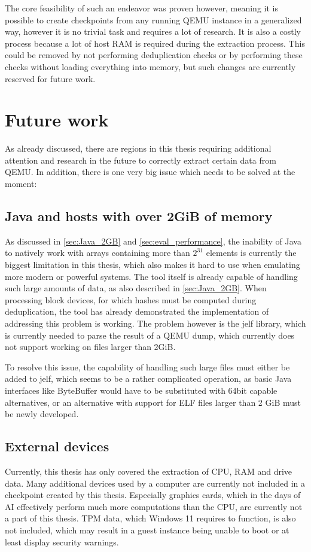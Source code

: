 The core feasibility of such an endeavor was proven however,
meaning it is possible to create checkpoints from any running QEMU instance in a generalized way,
however it is no trivial task and requires a lot of research.
It is also a costly process because a lot of host RAM is required during the extraction process.
This could be removed by not performing deduplication checks
or by performing these checks without loading everything into memory,
but such changes are currently reserved for future work.

\section{Future work}
As already discussed, there are regions in this thesis requiring additional attention and research in the future to correctly extract certain data from QEMU.
In addition, there is one very big issue which needs to be solved at the moment:

\subsection{Java and hosts with over 2GiB of memory}
As discussed in \autoref{sec:Java_2GB} and \autoref{sec:eval_performance},
the inability of Java to natively work with arrays containing more than $2^{31}$ elements
is currently the biggest limitation in this thesis,
which also makes it hard to use when emulating more modern or powerful systems.
The tool itself is already capable of handling such large amounts of data, as also described in \autoref{sec:Java_2GB}.
When processing block devices, for which hashes must be computed during deduplication,
the tool has already demonstrated the implementation of addressing this problem is working.
The problem however is the jelf library, which is currently needed to parse the result of a QEMU dump,
which currently does not support working on files larger than 2GiB.

To resolve this issue, the capability of handling such large files must either be added to jelf,
which seems to be a rather complicated operation,
as basic Java interfaces like ByteBuffer would have to be substituted with 64bit capable alternatives,
or an alternative with support for ELF files larger than 2 GiB must be newly developed.

\subsection{External devices}
Currently, this thesis has only covered the extraction of CPU, RAM and drive data.
Many additional devices used by a computer are currently not included in a checkpoint created by this thesis.
Especially graphics cards, which in the days of AI effectively perform much more computations than the CPU,
are currently not a part of this thesis.
TPM data, which Windows 11 requires to function, is also not included,
which may result in a guest instance being unable to boot or at least display security warnings.

